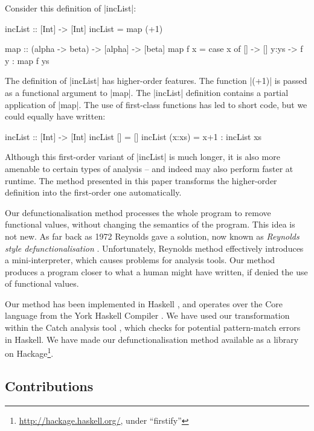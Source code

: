 \documentclass[preprint]{sigplanconf}
\begin{document}
\begin{example}
\label{ex:incList}

Consider this definition of |incList|:

\begin{code}
incList :: [Int] -> [Int]
incList = map (+1)

map :: (alpha -> beta) -> [alpha] -> [beta]
map f x = case  x of
                []    -> []
                y:ys  -> f y : map f ys
\end{code}

The definition of |incList| has higher-order features. The function |(+1)| is passed as a functional argument to |map|. The |incList| definition contains a partial application of |map|. The use of first-class functions has led to short code, but we could equally have written:

\begin{code}
incList :: [Int] -> [Int]
incList []      = []
incList (x:xs)  = x+1 : incList xs
\end{code}

Although this first-order variant of |incList| is much longer, it is also more amenable to certain types of analysis -- and indeed may also perform faster at runtime. The method presented in this paper transforms the higher-order definition into the first-order one automatically.
\end{example}

Our defunctionalisation method processes the whole program to remove functional values, without changing the semantics of the program. This idea is not new. As far back as 1972 Reynolds gave a solution, now known as \textit{Reynolds style defunctionalisation} \cite{reynolds:defunc}. Unfortunately, Reynolds method effectively introduces a mini-interpreter, which causes problems for analysis tools. Our method produces a program closer to what a human might have written, if denied the use of functional values.

Our method has been implemented in Haskell \cite{haskell}, and operates over the Core language from the York Haskell Compiler \cite{me:yhc_core}. We have used our transformation within the Catch analysis tool \cite{me:catch_icfp}, which checks for potential pattern-match errors in Haskell. We have made our defunctionalisation method available as a library on Hackage\footnote{\url{http://hackage.haskell.org/}, under ``firstify''}.

\subsection{Contributions}
\end{document}
